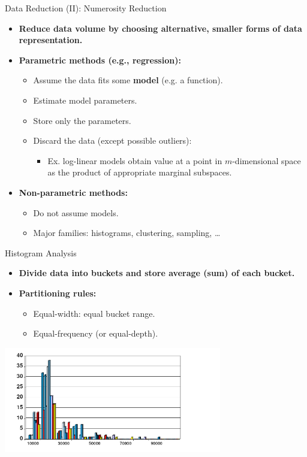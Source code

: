 \begin{frame}{Data Reduction (II): Numerosity Reduction}
	\begin{itemize}
		\item \textbf{Reduce data volume by choosing alternative, 
		{\color{airforceblue}smaller} forms of data representation.}
		\item \textbf{{\color{airforceblue}Parametric} methods (e.g., 
		regression):}
		\begin{itemize}
			\item Assume the data fits some 
			\textbf{{\color{airforceblue}model}} (e.g. a function).
			\item Estimate model parameters.
			\item Store only the parameters.
			\item Discard the data (except possible outliers):
			\begin{itemize}
				\item Ex. log-linear models obtain value at a point in 
				$m$-dimensional space as the product of appropriate marginal 
				subspaces.
			\end{itemize}
		\end{itemize}
		\item \textbf{{\color{airforceblue}Non-parametric} methods:}
		\begin{itemize}
			\item Do not assume models.
			\item Major families: histograms, clustering, sampling, \ldots
		\end{itemize}
	\end{itemize}
\end{frame}

\begin{frame}{Histogram Analysis}
	\begin{itemize}
		\item \textbf{Divide data into buckets and store average (sum) of each 
		bucket.}
		\item \textbf{Partitioning rules:}
		\begin{itemize}
			\item Equal-width: equal bucket range.
			\item Equal-frequency (or equal-depth).
		\end{itemize}
	\end{itemize}
	\centering
	\includegraphics[width=9.5cm]{img/histogram.png}
\end{frame}

